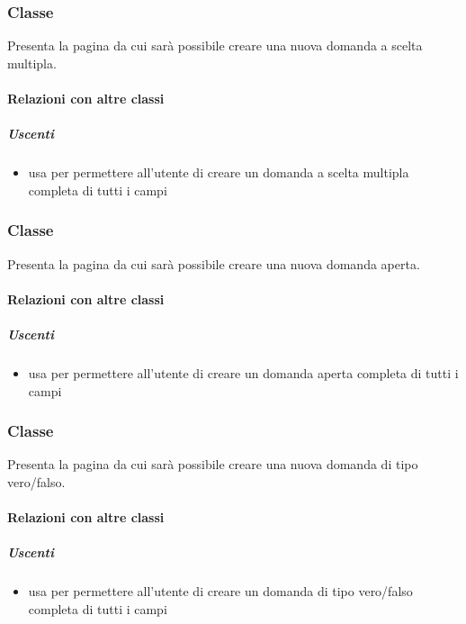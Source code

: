 \subsubsection{Classe }
Presenta la pagina da cui sarà possibile creare una nuova domanda a scelta multipla.
\paragraph{Relazioni con altre classi}
\subparagraph{Uscenti}
\begin{itemize}
\item usa  per permettere all'utente di creare un domanda a scelta multipla completa di tutti i campi
\end{itemize}
\subsubsection{Classe }
Presenta la pagina da cui sarà possibile creare una nuova domanda aperta.
\paragraph{Relazioni con altre classi}
\subparagraph{Uscenti}
\begin{itemize}
\item usa  per permettere all'utente di creare un domanda aperta completa di tutti i campi
\end{itemize}
\subsubsection{Classe }
Presenta la pagina da cui sarà possibile creare una nuova domanda di tipo vero/falso.
\paragraph{Relazioni con altre classi}
\subparagraph{Uscenti}
\begin{itemize}
\item usa  per permettere all'utente di creare un domanda di tipo vero/falso completa di tutti i campi
\end{itemize}
